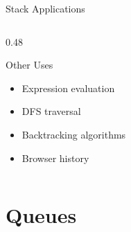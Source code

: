 \documentclass[aspectratio=169,xcolor=dvipsnames]{beamer}
\begin{document}
\begin{frame}[fragile]{Stack Applications}
\begin{columns}
\begin{column}{0.48\textwidth}
      \begin{block}{Other Uses}
        \begin{itemize}
          \item Expression evaluation
          \item DFS traversal
          \item Backtracking algorithms
          \item Browser history
        \end{itemize}
      \end{block}
    \end{column}
  \end{columns}
\end{frame}

\section{Queues}
\end{document}
